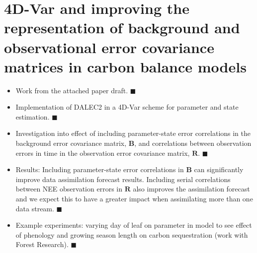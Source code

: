 \documentclass[11pt]{article}
\begin{document}
\section{4D-Var and improving the representation of background and observational error covariance matrices in carbon balance models} \label{sec:b&r}
\begin{itemize}
\item Work from the attached paper draft. {\color{green} $\blacksquare$}
\item Implementation of DALEC2 in a 4D-Var scheme for parameter and state estimation. {\color{green} $\blacksquare$}
\item Investigation into effect of including parameter-state error correlations in the background error covariance matrix, $\textbf{B}$, and correlations between observation errors in time in the observation error covariance matrix, $\textbf{R}$. {\color{green} $\blacksquare$}
\item Results: Including parameter-state error correlations in $\textbf{B}$ can significantly improve data assimilation forecast results. Including serial correlations between NEE observation errors in $\textbf{R}$ also improves the assimilation forecast and we expect this to have a greater impact when assimilating more than one data stream. {\color{green} $\blacksquare$}
\item Example experiments: varying day of leaf on parameter in model to see effect of phenology and growing season length on carbon sequestration (work with Forest Research). {\color{green} $\blacksquare$}
\end{itemize}
\end{document}
